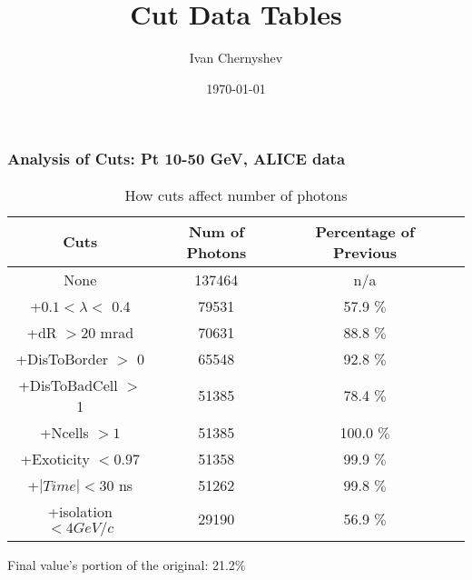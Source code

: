 \documentclass{beamer}
\title{Cut Data Tables}
\author{Ivan Chernyshev}
\date{\today}
\begin{document}
 

\frame 
{ 
\frametitle{Analysis of Cuts: Pt 10-50 GeV, ALICE data} 
\begin{table} 
\caption{How cuts affect number of photons} 
\centering 
\begin{tabular}{c c c c} 
\hline\hline 
Cuts & Num of Photons & Percentage of Previous\\ [0.5ex] 
\hline
None & 137464 & n/a\\
+$0.1 < \lambda <$ 0.4 & 79531 & 57.9 $\%$ \\
+dR $> 20$ mrad & 70631 & 88.8 $\%$ \\
+DisToBorder $>$ 0 & 65548 & 92.8 $\%$ \\
+DisToBadCell $>$ 1 & 51385 & 78.4 $\%$ \\
+Ncells $> 1$ & 51385 & 100.0 $\%$ \\
+Exoticity $< 0.97$ & 51358 & 99.9 $\%$ \\
+$|Time| < 30$ ns & 51262 & 99.8 $\%$ \\
+isolation $< 4 GeV/c$ & 29190 & 56.9 $\%$ \\
[1ex] 
\hline 
\end{tabular} 
\label{table:nonlin} 
\end{table} 
 Final value's portion of the original: 21.2\%
 } 
\end{document}
